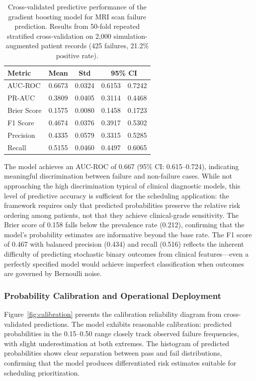 \documentclass[msom,blindrev]{informs3}
\begin{document}
\begin{table}[H]
\centering
\caption{Cross-validated predictive performance of the gradient boosting model for MRI scan failure prediction. Results from 50-fold repeated stratified cross-validation on 2,000 simulation-augmented patient records (425 failures, 21.2\% positive rate).}
\label{tab:ml_cv_metrics}
\begin{tabular}{lcccc}
\toprule
Metric & Mean & Std & \multicolumn{2}{c}{95\% CI} \\
\midrule
AUC-ROC & 0.6673 & 0.0324 & 0.6153 & 0.7242 \\
PR-AUC & 0.3809 & 0.0405 & 0.3114 & 0.4468 \\
Brier Score & 0.1575 & 0.0080 & 0.1458 & 0.1723 \\
F1 Score & 0.4674 & 0.0376 & 0.3917 & 0.5302 \\
Precision & 0.4335 & 0.0579 & 0.3315 & 0.5285 \\
Recall & 0.5155 & 0.0460 & 0.4497 & 0.6065 \\
\bottomrule
\end{tabular}
\end{table}

The model achieves an AUC-ROC of 0.667 (95\% CI: 0.615--0.724), indicating meaningful discrimination between failure and non-failure cases. While not approaching the high discrimination typical of clinical diagnostic models, this level of predictive accuracy is sufficient for the scheduling application: the framework requires only that predicted probabilities preserve the relative risk ordering among patients, not that they achieve clinical-grade sensitivity. The Brier score of 0.158 falls below the prevalence rate (0.212), confirming that the model's probability estimates are informative beyond the base rate. The F1 score of 0.467 with balanced precision (0.434) and recall (0.516) reflects the inherent difficulty of predicting stochastic binary outcomes from clinical features---even a perfectly specified model would achieve imperfect classification when outcomes are governed by Bernoulli noise.

\subsubsection{Probability Calibration and Operational Deployment}

Figure~\ref{fig:calibration} presents the calibration reliability diagram from cross-validated predictions. The model exhibits reasonable calibration: predicted probabilities in the 0.15--0.50 range closely track observed failure frequencies, with slight underestimation at both extremes. The histogram of predicted probabilities shows clear separation between pass and fail distributions, confirming that the model produces differentiated risk estimates suitable for scheduling prioritization.
\end{document}

